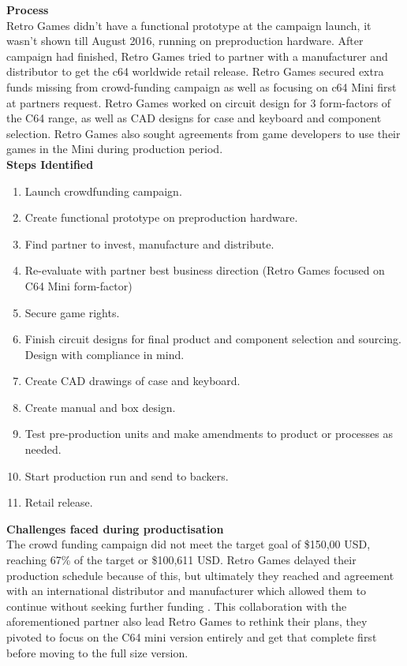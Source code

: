 \textbf{Process}\\
Retro Games didn't have a functional prototype at the campaign launch, it wasn't shown till August 2016, running on preproduction hardware. After campaign had finished, Retro Games tried to partner with a manufacturer and distributor to get the c64 worldwide retail release. Retro Games secured extra funds missing from crowd-funding campaign as well as focusing on c64 Mini first at partners request. Retro Games worked on circuit design for 3 form-factors of the C64 range, as well as CAD designs for case and keyboard and component selection. Retro Games also sought agreements from game developers to use their games in the Mini during production period. \\

\textbf{Steps Identified}
\begin{enumerate}
\item Launch crowdfunding campaign.
\item Create functional prototype on preproduction hardware.
\item Find partner to invest, manufacture and distribute.
\item Re-evaluate with partner best business direction (Retro Games focused on C64 Mini form-factor)
\item Secure game rights.
\item Finish circuit designs for final product and component selection and sourcing. Design with compliance in mind.
\item Create CAD drawings of case and keyboard.
\item Create manual and box design.
\item Test pre-production units and make amendments to product or processes as needed.
\item Start production run and send to backers.
\item Retail release.
\end{enumerate} 

\textbf{Challenges faced during productisation}\\
The crowd funding campaign did not meet the target goal of \$150,00 USD, reaching 67\% of the target or \$100,611 USD. Retro Games delayed their production schedule because of this, but ultimately they reached and agreement with an international distributor and manufacturer which allowed them to continue without seeking further funding
\cite{RN125}. This collaboration with the aforementioned partner also lead Retro Games to rethink their plans, they pivoted to focus on the C64 mini version entirely and get that complete first before moving to the full size version. \\

